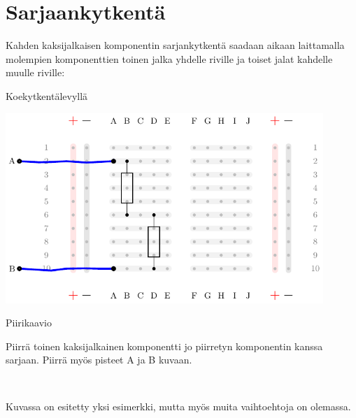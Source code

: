 \section{Sarjaankytkentä}
Kahden kaksijalkaisen komponentin sarjankytkentä saadaan aikaan laittamalla molempien komponenttien toinen jalka yhdelle riville ja toiset jalat kahdelle muulle riville: 

\begin{minipage}{0.8\textwidth}
\begin{center}
Koekytkentälevyllä
\end{center}
\includegraphics[width=0.9\textwidth]{kuvat/kuva2.pdf}
\end{minipage}
\begin{minipage}{0.2\textwidth}
Piirikaavio\\
\end{minipage}


\begin{tcolorbox}[colback=yellow!10, title={Testaa taitosi!},colbacktitle=orange]
Piirrä toinen kaksijalkainen komponentti jo piirretyn komponentin kanssa sarjaan. Piirrä myös pisteet A ja B kuvaan. 

\\
\begin{solution}
Kuvassa on esitetty yksi esimerkki, mutta myös muita vaihtoehtoja on olemassa.
\end{solution}
\end{tcolorbox}

